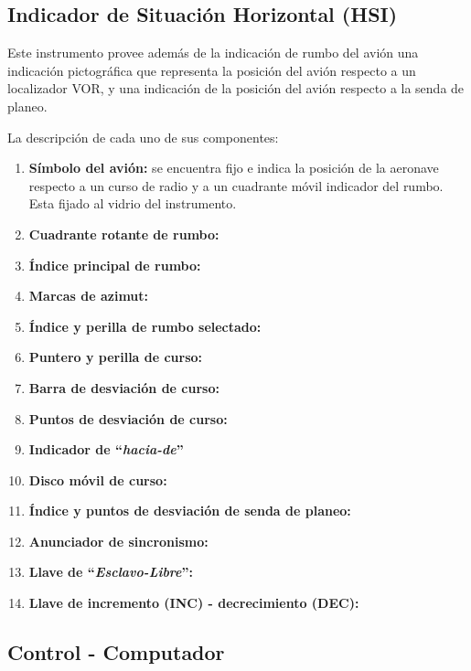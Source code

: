 \documentclass[a4paper,12pt,twoside]{article}
\begin{document}
\subsection{Indicador de Situaci\'on Horizontal (HSI)}
\label{sec:indicador.situacion.horizontal}

Este instrumento provee adem\'as de la indicaci\'on de rumbo del avi\'on
una indicaci\'on pictogr\'afica que representa la posici\'on
del avi\'on respecto a un localizador VOR, y una indicaci\'on de la
posici\'on del avi\'on respecto a la senda de planeo.

La descripci\'on de cada uno de sus componentes:

\begin{enumerate}{\bf a)}
	\item {\bf S\'imbolo del avi\'on:} se encuentra fijo e indica la
		posici\'on de la aeronave respecto a un curso de radio
		y a un cuadrante m\'ovil indicador del rumbo. Esta fijado
		al vidrio del instrumento.
        \item {\bf Cuadrante rotante de rumbo:}
        \item {\bf \'Indice principal de rumbo:}
        \item {\bf Marcas de azimut:}
        \item {\bf \'Indice y perilla de rumbo selectado:}
        \item {\bf Puntero y perilla de curso:}
        \item {\bf Barra de desviaci\'on de curso:}
        \item {\bf Puntos de desviaci\'on de curso:}
        \item {\bf Indicador de ``\emph{hacia-de}'' }
        \item {\bf Disco m\'ovil de curso:}
        \item {\bf \'Indice y puntos de desviaci\'on de senda de planeo:}
        \item {\bf Anunciador de sincronismo:}
        \item {\bf Llave de ``\emph{Esclavo-Libre}'':}
        \item {\bf Llave de incremento (INC) - decrecimiento (DEC):}

\end{enumerate}

\subsection{Control - Computador}
\label{sec:control.computador}
\end{document}
